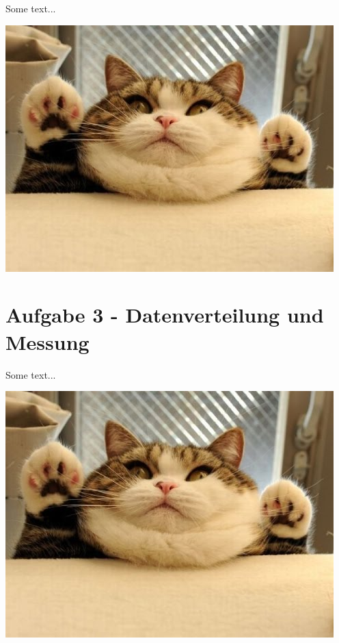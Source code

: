 \documentclass[paper=a4, fontsize=11pt]{scrartcl} %
\numberwithin{equation}{section} %
\numberwithin{figure}{section} %
\numberwithin{table}{section} %
\begin{document}
Some text...

\includegraphics[width=\linewidth]{imgs/cat.jpg}

\section{Aufgabe 3 - Datenverteilung und Messung}

Some text...

\includegraphics[width=\linewidth]{imgs/cat.jpg}
\end{document}
